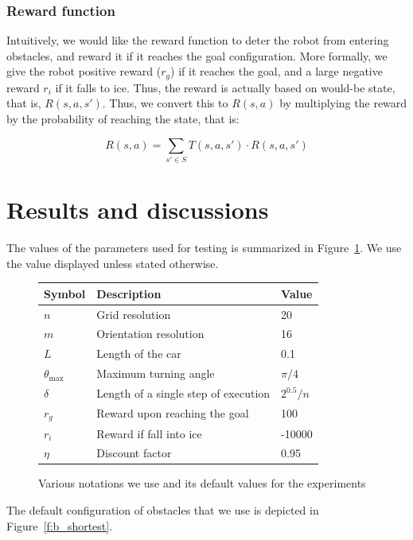 \documentclass[a4paper]{article}
\begin{document}
\subsubsection{Reward function}
\label{sec:r}
Intuitively, we would like the reward function to deter the robot from entering
obstacles, and reward it if it reaches the goal configuration. More formally,
we give the robot positive reward ($r_g$) if it reaches the goal, and a large negative
reward $r_i$ if it falls to ice. Thus, the reward is actually based on would-be state,
that is, $R(s, a, s')$. Thus, we convert this to $R(s, a)$ by multiplying the
reward by the probability of reaching the state, that is:

\[ R(s, a) = \sum_{s' \in S} T(s, a, s') \cdot R(s, a, s') \]

\section{Results and discussions}

The values of the parameters used for testing is summarized in Figure~\ref{f:notations}.
We use the value displayed unless stated otherwise.

\begin{figure}
\label{f:notations}
\caption{Various notations we use and its default values for the experiments}
\begin{tabular}{ l | l | l }
  Symbol & Description & Value \\ \hline \hline
  $n$ & Grid resolution & 20 \\ \hline
  $m$ & Orientation resolution & 16 \\ \hline
  $L$ & Length of the car & 0.1 \\ \hline
  $\theta_{\text{max}}$ & Maximum turning angle & $\pi / 4$ \\ \hline
  $\delta$ & Length of a single step of execution & $2^{0.5} / n$ \\ \hline
  $r_g$ & Reward upon reaching the goal & 100 \\ \hline
  $r_i$ & Reward if fall into ice & -10000 \\ \hline
  $\eta$ & Discount factor & 0.95 \\ \hline
\end{tabular}
\end{figure}

The default configuration of obstacles that we use is depicted in Figure~\ref{f:b_shortest}.
\end{document}
